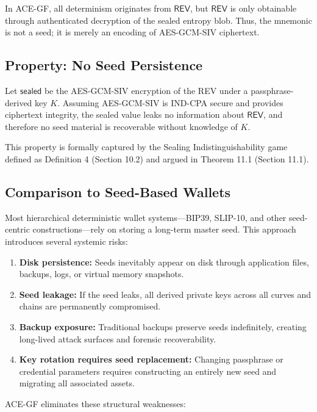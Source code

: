\documentclass[12pt,a4paper]{article}
\begin{document}
  In ACE-GF, all determinism originates from $\mathsf{REV}$, but $\mathsf{REV}$
  is only obtainable through authenticated decryption of the sealed entropy blob.
  Thus, the mnemonic is not a seed; it is merely an encoding of AES-GCM-SIV ciphertext.

  \subsection{Property: No Seed Persistence}

  Let $\mathsf{sealed}$ be the AES-GCM-SIV encryption of the REV under a passphrase-derived key $K$. Assuming AES-GCM-SIV is IND-CPA secure and provides ciphertext integrity, the sealed value leaks no information about $\mathsf{REV}$, and therefore no seed material is recoverable without knowledge of $K$.

  This property is formally captured by the Sealing Indistinguishability game defined as Definition 4 (Section 10.2) and argued in Theorem 11.1 (Section 11.1).

  \subsection{Comparison to Seed-Based Wallets}

  Most hierarchical deterministic wallet systems---BIP39, SLIP-10, and other
  seed-centric constructions---rely on storing a long-term master seed.
  This approach introduces several systemic risks:

  \begin{enumerate}
   \item \textbf{Disk persistence:}
   Seeds inevitably appear on disk through application files, backups, logs,
   or virtual memory snapshots.

   \item \textbf{Seed leakage:}
   If the seed leaks, all derived private keys across all curves and chains
   are permanently compromised.

   \item \textbf{Backup exposure:}
   Traditional backups preserve seeds indefinitely, creating long-lived attack
   surfaces and forensic recoverability.

   \item \textbf{Key rotation requires seed replacement:}
   Changing passphrase or credential parameters requires constructing an
   entirely new seed and migrating all associated assets.

  \end{enumerate}
  ACE-GF eliminates these structural weaknesses:
\end{document}
